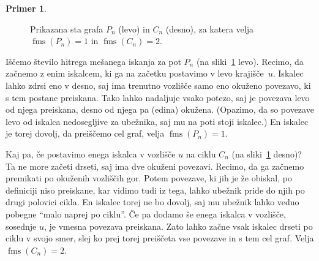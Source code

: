 \documentclass[12pt,a4paper,twoside]{article}
\theoremstyle{definition} %
\newtheorem{primer}[definicija]{Primer}
\theoremstyle{plain} %
\numberwithin{equation}{section}  %
\DeclareMathOperator{\fms}{fms}
\begin{document}
\begin{primer}
\begin{figure}[h]
\begin{subfigure}{0.49\textwidth}
        \end{subfigure}
        \caption{Prikazana sta grafa $P_n$ (levo) in $C_n$ (desno), za katera velja $\fms{(P_n)} = 1$ in $\fms{(C_n)}=2$.}
        \label{fig:fms-pot-cikel}
    \end{figure}
    Iščemo število hitrega mešanega iskanja za pot $P_n$ (na sliki~\ref{fig:fms-pot-cikel} levo). Recimo, da začnemo z enim iskalcem, ki ga na začetku postavimo v levo krajišče~$u$. Iskalec lahko zdrsi eno v desno, saj ima trenutno vozlišče samo eno okuženo povezavo, ki s tem postane preiskana. Tako lahko nadaljuje vsako potezo, saj je povezava levo od njega preiskana, desno od njega pa (edina) okužena. (Opazimo, da so povezave levo od iskalca nedosegljive za ubežnika, saj mu na poti stoji iskalec.) En iskalec je torej dovolj, da preiščemo cel graf, velja $\fms{(P_n)} = 1$.

    Kaj pa, če postavimo enega iskalca v vozlišče $u$ na ciklu $C_n$ (na sliki~\ref{fig:fms-pot-cikel} desno)? Ta ne more začeti drseti, saj ima dve okuženi povezavi. Recimo, da ga začnemo premikati po okuženih vozliščih gor. Potem povezave, ki jih je že obiskal, po definiciji niso preiskane, kar vidimo tudi iz tega, lahko ubežnik pride do njih po drugi polovici cikla. En iskalec torej ne bo dovolj, saj mu ubežnik lahko vedno pobegne ``malo naprej po ciklu''. Če pa dodamo še enega iskalca v vozlišče, sosednje $u$, je vmesna povezava preiskana. Zato lahko začne vsak iskalec drseti po ciklu v svojo smer, slej ko prej torej preiščeta vse povezave in s tem cel graf. Velja $\fms{(C_n)} = 2$.
\end{primer}
\end{document}
